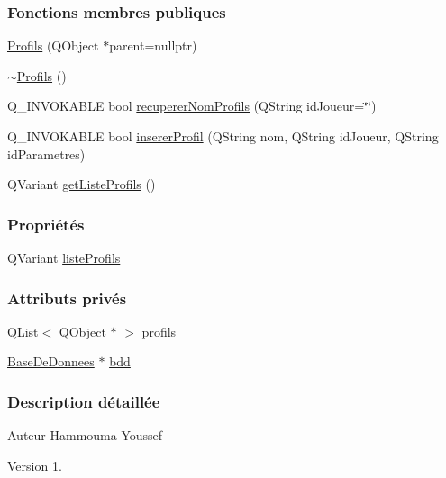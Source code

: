 \subsubsection*{Fonctions membres publiques}
\begin{DoxyCompactItemize}
\item 
\hyperlink{class_profils_abe936fbdac7c189d93aca3fcd8f6c7e6}{Profils} (Q\+Object $\ast$parent=nullptr)
\item 
\hyperlink{class_profils_a71dfd5d2637dd4020a75e18fe08a8d5a}{$\sim$\+Profils} ()
\item 
Q\+\_\+\+I\+N\+V\+O\+K\+A\+B\+LE bool \hyperlink{class_profils_afe85f77aead9a7ea2f09f676d6e2c663}{recuperer\+Nom\+Profils} (Q\+String id\+Joueur=\char`\"{}\char`\"{})
\item 
Q\+\_\+\+I\+N\+V\+O\+K\+A\+B\+LE bool \hyperlink{class_profils_ae560041d0af81c5b77a8448d78122d04}{inserer\+Profil} (Q\+String nom, Q\+String id\+Joueur, Q\+String id\+Parametres)
\item 
Q\+Variant \hyperlink{class_profils_aca3d2255478f977eaa84ffa3eea920b1}{get\+Liste\+Profils} ()
\end{DoxyCompactItemize}
\subsubsection*{Propriétés}
\begin{DoxyCompactItemize}
\item 
Q\+Variant \hyperlink{class_profils_a0aac746ed598eec04e440e0825a191a1}{liste\+Profils}
\end{DoxyCompactItemize}
\subsubsection*{Attributs privés}
\begin{DoxyCompactItemize}
\item 
Q\+List$<$ Q\+Object $\ast$ $>$ \hyperlink{class_profils_ae5de1fe3b6121bec80e3def390b5df15}{profils}
\item 
\hyperlink{class_base_de_donnees}{Base\+De\+Donnees} $\ast$ \hyperlink{class_profils_a3703186987f1cd98ec9ca85d43f63fb7}{bdd}
\end{DoxyCompactItemize}


\subsubsection{Description détaillée}
\begin{DoxyAuthor}{Auteur}
Hammouma Youssef
\end{DoxyAuthor}
\begin{DoxyVersion}{Version}
1. 
\end{DoxyVersion}


